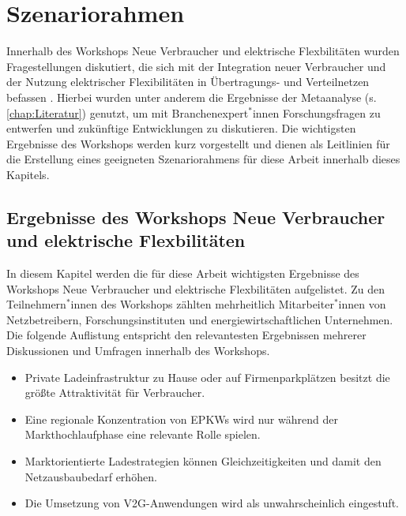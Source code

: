 
\section{Szenariorahmen}\label{chap:Szenariorahmen}

Innerhalb des Workshops \glqq Neue Verbraucher und elektrische Flexbilitäten\grqq{} wurden Fragestellungen diskutiert, die sich mit der Integration neuer Verbraucher und der Nutzung elektrischer Flexibilitäten in Übertragungs- und Verteilnetzen befassen \cite{RLI2020}.
Hierbei wurden unter anderem die Ergebnisse der Metaanalyse (s. \autoref{chap:Literatur}) genutzt, um mit Branchenexpert$^*$innen Forschungsfragen zu entwerfen und zukünftige Entwicklungen zu diskutieren.
Die wichtigsten Ergebnisse des Workshops werden kurz vorgestellt und dienen als Leitlinien für die Erstellung eines geeigneten Szenariorahmens für diese Arbeit innerhalb dieses Kapitels.


\subsection{Ergebnisse des Workshops \glqq Neue Verbraucher und elektrische Flexbilitäten\grqq{}}

In diesem Kapitel werden die für diese Arbeit wichtigsten Ergebnisse des Workshops \glqq Neue Verbraucher und elektrische Flexbilitäten\grqq{} aufgelistet.
Zu den Teilnehmern$^*$innen des Workshops zählten mehrheitlich Mitarbeiter$^*$innen von Netzbetreibern, Forschungsinstituten und energiewirtschaftlichen Unternehmen.
Die folgende Auflistung entspricht den relevantesten Ergebnissen mehrerer Diskussionen und Umfragen innerhalb des Workshops.

\begin{itemize}
	\item Private Ladeinfrastruktur zu Hause oder auf Firmenparkplätzen besitzt die größte Attraktivität für Verbraucher.
	\item Eine regionale Konzentration von \glspl{EPKW} wird nur während der Markthochlaufphase eine relevante Rolle spielen.
	\item Marktorientierte Ladestrategien können Gleichzeitigkeiten und damit den Netzausbaubedarf erhöhen.
	\item Die Umsetzung von \gls{V2G}-Anwendungen wird als unwahrscheinlich eingestuft.
	
\end{itemize}


